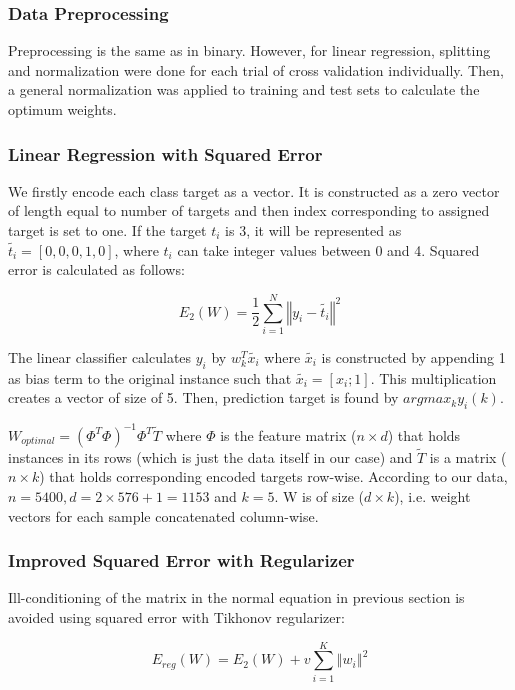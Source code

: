 \documentclass[10pt]{article}
\begin{document}
\subsubsection{Data Preprocessing}
Preprocessing is the same as in binary. However, for linear regression, splitting and normalization were done for each trial of cross validation individually. Then, a general normalization was applied to training and test sets to calculate the optimum weights.

\subsubsection{Linear Regression with Squared Error}
We firstly encode each class target as a vector. It is constructed as a zero vector of length equal to number of targets and then index corresponding to assigned target is set to one. If the target $t_i$ is 3, it will be represented as $\tilde{t_{i}}=[0, 0, 0, 1, 0]$, where $t_i$ can take integer values between 0 and 4. Squared error is calculated as follows:

\begin{equation}\label{eq:sqrerr}E_{2}(W)=\frac{1}{2}\sum_{i=1}^N\left\Vert y_i - \tilde{t_i}\right\Vert^2 \end{equation}

The linear classifier calculates $y_i$ by $w_{k}^T\tilde{x_i}$ where $\tilde{x_i}$ is constructed by appending 1 as bias term to the original instance such that $\tilde{x_i}=[x_i; 1]$. This multiplication creates a vector of size of 5. Then, prediction target is found by $argmax_k y_i(k)$.

$W_{optimal}={(\Phi^T\Phi)}^{-1}\Phi^T \tilde{T}$ where $\Phi$ is the feature matrix ($n \times d$) that holds instances in its rows (which is just the data itself in our case) and $\tilde{T}$ is a matrix ($n \times k$) that holds corresponding encoded targets row-wise. According to our data, $n=5400, d=2\times576+1=1153$ and $k=5$. W is of size ($d \times k$), i.e. weight vectors for each sample concatenated column-wise.

\subsubsection{Improved Squared Error with Regularizer}
Ill-conditioning of the matrix in the normal equation in previous section is avoided using squared error with Tikhonov regularizer:

\begin{equation}\label{eq:reg_tik} E_{reg}(W)=E_2(W) + v \sum^K_{i=1}{\left\Vert w_i \right\Vert}^2 \end{equation}
\end{document}
